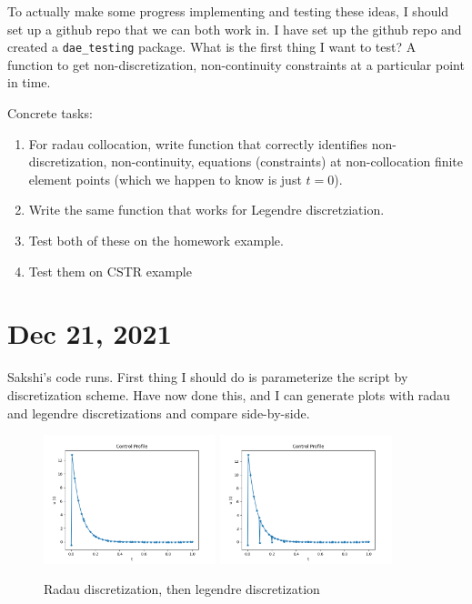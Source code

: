 \documentclass{article}
\begin{document}
\medskip

To actually make some progress implementing and testing these ideas, I should
set up a github repo that we can both work in.
I have set up the github repo and created a \texttt{dae\_testing} package.
What is the first thing I want to test? A function to get non-discretization,
non-continuity constraints at a particular point in time.

\medskip
Concrete tasks:
\begin{enumerate}
  \item For radau collocation, write function that correctly identifies
    non-discretization, non-continuity, equations (constraints) at
    non-collocation finite element points (which we happen to know is just
    $t=0$).
  \item Write the same function that works for Legendre discretziation.
  \item Test both of these on the homework example.
  \item Test them on CSTR example
\end{enumerate}

\section{Dec 21, 2021}

Sakshi's code runs. First thing I should do is parameterize the script
by discretization scheme. Have now done this, and I can generate plots with
radau and legendre discretizations and compare side-by-side.

\begin{figure}[!h]
  \centering
  \includegraphics[width=5cm]{radau_control_profile.png}
  \includegraphics[width=5cm]{legendre_control_profile.png}
  \caption{Radau discretization, then legendre discretization}
\end{figure}
\end{document}
